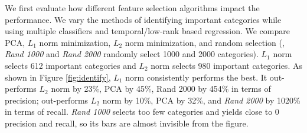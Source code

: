 

 We first evaluate how 
different feature selection algorithms impact 
the performance. We vary the methods of identifying important
categories while using multiple
classifiers and temporal/low-rank based regression. We compare PCA, $L_1$ norm minimization, $L_2$ norm
minimization, and random selection (\eg, {\em Rand 1000} and {\em Rand
 2000} randomly select 1000 and 2000 categories). $L_1$ norm selects 612 important categories and $L_2$ norm selects 980 important categories.
As shown in Figure \ref{fig:identify}, $L_1$ norm consistently
performs the best. It out-performs $L_2$ norm by 23\%, PCA by 45\%,
Rand 2000 by 454\% in terms of precision; out-performs $L_2$ norm by
10\%, PCA by 32\%, and {\em Rand 2000} by 1020\% in terms of
recall. {\em Rand 1000} selects too few categories and yields close to
0 precision and recall, so its bars are almost invisible from the figure.




